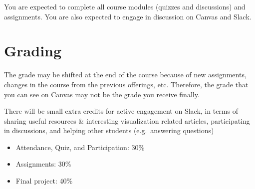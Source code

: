 \documentclass[11pt,article,oneside]{memoir} %
\begin{document}
You are expected to complete all course modules (quizzes and discussions) and assignments. You are also expected to engage in discussion on Canvas and Slack. 



\section{Grading}\label{sec:grading_tentative_}%

The grade may be shifted at the end of the course because of new assignments, changes in the course from the previous offerings, etc. Therefore, the grade that you can see on Canvas may not be the grade you receive finally. 

There will be small extra credits for active engagement on Slack, in terms of sharing useful resources \& interesting visualization related articles, participating in discussions, and helping other students (e.g.~answering questions)

\begin{itemize}%

\item Attendance, Quiz, and Participation: 30\% 

\item Assignments: 30\% 


\item Final project: 40\%

\end{itemize}%
\end{document}
